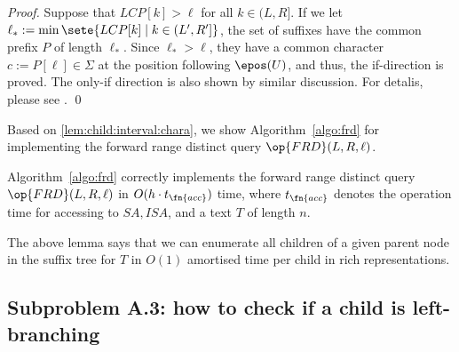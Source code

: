 \begin{proof}
Suppose that $LCP[k] > \ell$ for all $k \in (L, R]$.
If we let $\ell_* := \min\sete{ LCP[k] \mid k \in (L',R'] }$, the set of suffixes have the common prefix $P$ of length $\ell_*$. Since $\ell_* > \ell$, they have a common character $c := P[\ell] \in \Sigma$ at the position following $\epos(U)$, and thus, the if-direction is proved. The only-if direction is also shown by similar discussion. For detalis, please see \cite[Lemma~4.3.5]{ohlebusch2013bookbioinfo}.
\qed
\end{proof}

Based on \cref{lem:child:interval:chara}, we show Algorithm~\ref{algo:frd} for implementing the forward range distinct query $\op{FRD}(L, R, \ell)$. 

\begin{lemma}
\label{lem:algofst:frd}
Algorithm~\ref{algo:frd} correctly implements the forward range distinct query $\op{FRD}(L, R, \ell)$ in $O(h\cdot t_\fn{acc})$ time, where $t_\fn{acc}$ denotes the operation time for accessing to $SA, ISA$, and a text $T$ of length $n$. 
\end{lemma}

The above lemma says that we can enumerate all children of a given parent node in the suffix tree for $T$ in $O(1)$ amortised time per child in rich representations.    


  \subsection{Subproblem A.3: how to check if a child is left-branching}


